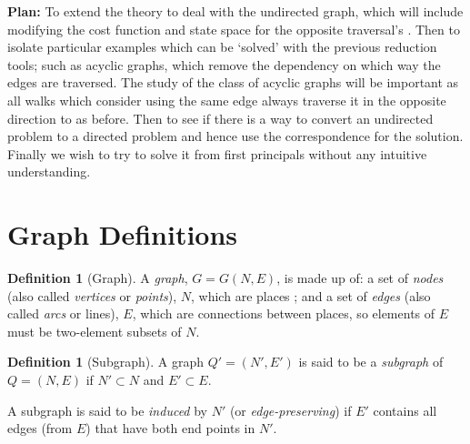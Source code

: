 \documentclass[a4paper,10pt]{article}
\theoremstyle{definition}
\newtheorem{definition}[theorem]{Definition}
\theoremstyle{definition}
\theoremstyle{remark}
\theoremstyle{definition}
\begin{document}
\textbf{Plan:} To extend the theory to deal with the undirected graph, which  will include modifying the cost function and state space for the opposite traversal's . Then to isolate particular examples which can be `solved' with the previous reduction tools; such as acyclic graphs, which remove the dependency on which way the edges are traversed. The study of the class of  acyclic graphs will be important as all walks which consider using the same edge always traverse it in the opposite direction to as before. Then to see if there is a way to convert an undirected problem to a directed problem and hence use the correspondence for the solution. Finally we wish to try to solve it from first principals without any intuitive understanding.



\newpage
\appendix
{}
\appendixpage
\addappheadtotoc
\section{Graph Definitions}
\label{Appendix:Graph Definitions}
\begin{definition}[Graph]
A \textit{graph}, $G=G(N,E)$, is made up of: a set of \textit{nodes} (also called \textit{vertices} or \textit{points}), $N$, which are places ; and a set of \textit{edges} (also called \textit{arcs} or lines), $E$, which are connections between places, so elements of $E$ must be two-element subsets of $N$.
\end{definition}


\begin{definition}[Subgraph]
A graph $Q'=(N',E')$ is said to be a \textit{subgraph} of $Q=(N,E)$ if $N' \subset N$ and $E' \subset E$.

A subgraph is said to be \textit{induced} by $N'$ (or \textit{edge-preserving}) if $E'$ contains all edges (from $E$) that have both end points in $N'$.
\end{definition}
\end{document}
